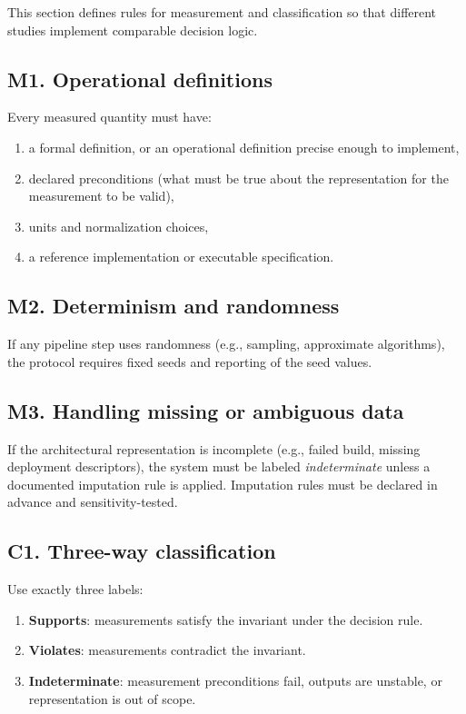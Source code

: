 This section defines rules for measurement and classification so that different studies implement comparable decision logic.

\subsection*{M1. Operational definitions}
Every measured quantity must have:
\begin{enumerate}[leftmargin=*]
  \item a formal definition, or an operational definition precise enough to implement,
  \item declared preconditions (what must be true about the representation for the measurement to be valid),
  \item units and normalization choices,
  \item a reference implementation or executable specification.
\end{enumerate}

\subsection*{M2. Determinism and randomness}
If any pipeline step uses randomness (e.g., sampling, approximate algorithms), the protocol requires fixed seeds and reporting of the seed values.

\subsection*{M3. Handling missing or ambiguous data}
If the architectural representation is incomplete (e.g., failed build, missing deployment descriptors), the system must be labeled \textit{indeterminate} unless a documented imputation rule is applied. Imputation rules must be declared in advance and sensitivity-tested.

\subsection*{C1. Three-way classification}
Use exactly three labels:
\begin{enumerate}[leftmargin=*]
  \item \textbf{Supports}: measurements satisfy the invariant under the decision rule.
  \item \textbf{Violates}: measurements contradict the invariant.
  \item \textbf{Indeterminate}: measurement preconditions fail, outputs are unstable, or representation is out of scope.
\end{enumerate}

